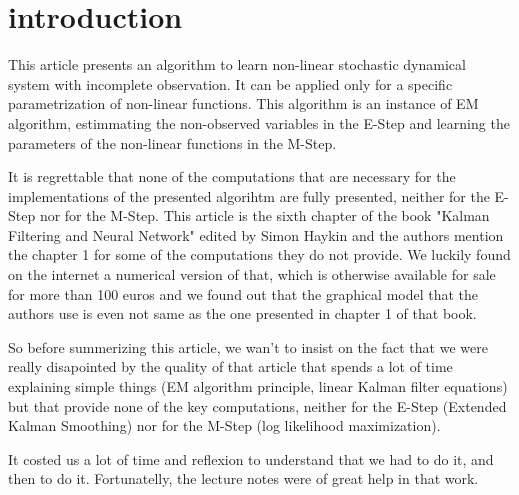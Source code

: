 \section*{introduction}

This article presents an algorithm to learn non-linear stochastic dynamical system with incomplete observation.
It can be applied only for a specific parametrization of non-linear functions.
This algorithm is an instance of EM algorithm, estimmating the non-observed variables in the E-Step and learning the parameters of the non-linear functions in the M-Step.

It is regrettable that none of the computations that are necessary for the implementations of the presented algorihtm are fully presented, neither for the E-Step nor for the M-Step.
This article is the sixth chapter of the book "Kalman Filtering and Neural Network" edited by Simon Haykin and the authors mention the chapter 1 for some of the computations they do not provide.
We luckily found on the internet a numerical version of that, which is otherwise available for sale for more than 100 euros and we found out that the graphical model that the authors use is even not same as the one presented in chapter 1 of that book.

So before summerizing this article, we wan't to insist on the fact that we were really disapointed by the quality of that article that spends a lot of time explaining simple things (EM algorithm principle, linear Kalman filter equations) but that provide none of the key computations, neither for the E-Step (Extended Kalman Smoothing) nor for the M-Step (log likelihood maximization).

It costed us a lot of time and reflexion to understand that we had to do it, and then to do it.
Fortunatelly, the lecture notes were of great help in that work.
